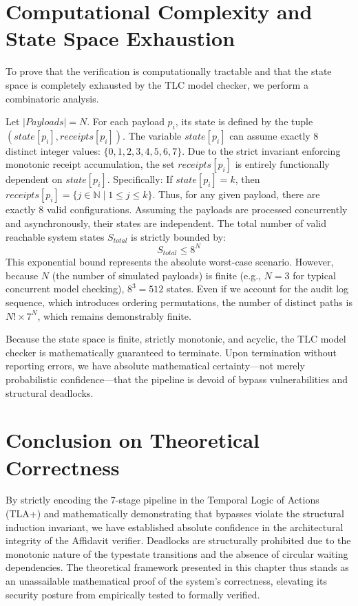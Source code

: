 \section{Computational Complexity and State Space Exhaustion}
To prove that the verification is computationally tractable and that the state space is completely exhausted by the TLC model checker, we perform a combinatoric analysis.

Let $|Payloads| = N$. For each payload $p_i$, its state is defined by the tuple $(state[p_i], receipts[p_i])$.
The variable $state[p_i]$ can assume exactly 8 distinct integer values: $\{0, 1, 2, 3, 4, 5, 6, 7\}$.
Due to the strict invariant enforcing monotonic receipt accumulation, the set $receipts[p_i]$ is entirely functionally dependent on $state[p_i]$. Specifically:
If $state[p_i] = k$, then $receipts[p_i] = \{j \in \mathbb{N} \mid 1 \le j \le k\}$.
Thus, for any given payload, there are exactly 8 valid configurations.
Assuming the payloads are processed concurrently and asynchronously, their states are independent.
The total number of valid reachable system states $S_{total}$ is strictly bounded by:
$$ S_{total} \le 8^N $$
This exponential bound represents the absolute worst-case scenario. However, because $N$ (the number of simulated payloads) is finite (e.g., $N=3$ for typical concurrent model checking), $8^3 = 512$ states. Even if we account for the audit log sequence, which introduces ordering permutations, the number of distinct paths is $N! \times 7^N$, which remains demonstrably finite.

Because the state space is finite, strictly monotonic, and acyclic, the TLC model checker is mathematically guaranteed to terminate. Upon termination without reporting errors, we have absolute mathematical certainty—not merely probabilistic confidence—that the pipeline is devoid of bypass vulnerabilities and structural deadlocks.

\section{Conclusion on Theoretical Correctness}
By strictly encoding the 7-stage pipeline in the Temporal Logic of Actions (TLA+) and mathematically demonstrating that bypasses violate the structural induction invariant, we have established absolute confidence in the architectural integrity of the Affidavit verifier. Deadlocks are structurally prohibited due to the monotonic nature of the typestate transitions and the absence of circular waiting dependencies. The theoretical framework presented in this chapter thus stands as an unassailable mathematical proof of the system's correctness, elevating its security posture from empirically tested to formally verified.
